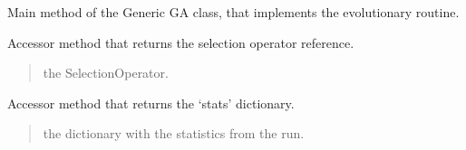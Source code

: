 \documentclass[letterpaper,10pt,english]{sphinxmanual}
\begin{document}
\begin{fulllineitems}
\begin{fulllineitems}
\label{\detokenize{pygenalgo.engines:pygenalgo.engines.generic_ga.GenericGA.run}}
\pysigstartsignatures
\pysiglinewithargsret
{}
{\sphinxparamcomma {}}
{}
\pysigstopsignatures
\sphinxAtStartPar
Main method of the Generic GA class, that implements the evolutionary routine.

\end{fulllineitems}


\begin{fulllineitems}
\label{\detokenize{pygenalgo.engines:pygenalgo.engines.generic_ga.GenericGA.select_op}}
\pysigstartsignatures
\pysigline
{}
\pysigstopsignatures
\sphinxAtStartPar
Accessor method that returns the selection operator reference.
\begin{quote}\begin{description}
\sphinxAtStartPar
the SelectionOperator.

\end{description}\end{quote}

\end{fulllineitems}


\begin{fulllineitems}
\label{\detokenize{pygenalgo.engines:pygenalgo.engines.generic_ga.GenericGA.stats}}
\pysigstartsignatures
\pysigline
{}
\pysigstopsignatures
\sphinxAtStartPar
Accessor method that returns the ‘stats’ dictionary.
\begin{quote}\begin{description}
\sphinxAtStartPar
the dictionary with the statistics from the run.

\end{description}\end{quote}

\end{fulllineitems}


\end{fulllineitems}
\end{document}
